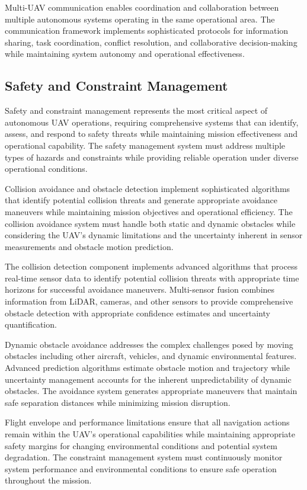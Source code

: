 Multi-UAV communication enables coordination and collaboration between multiple autonomous systems operating in the same operational area. The communication framework implements sophisticated protocols for information sharing, task coordination, conflict resolution, and collaborative decision-making while maintaining system autonomy and operational effectiveness.

\subsection{Safety and Constraint Management}

Safety and constraint management represents the most critical aspect of autonomous UAV operations, requiring comprehensive systems that can identify, assess, and respond to safety threats while maintaining mission effectiveness and operational capability. The safety management system must address multiple types of hazards and constraints while providing reliable operation under diverse operational conditions.

Collision avoidance and obstacle detection implement sophisticated algorithms that identify potential collision threats and generate appropriate avoidance maneuvers while maintaining mission objectives and operational efficiency. The collision avoidance system must handle both static and dynamic obstacles while considering the UAV's dynamic limitations and the uncertainty inherent in sensor measurements and obstacle motion prediction.

The collision detection component implements advanced algorithms that process real-time sensor data to identify potential collision threats with appropriate time horizons for successful avoidance maneuvers. Multi-sensor fusion combines information from LiDAR, cameras, and other sensors to provide comprehensive obstacle detection with appropriate confidence estimates and uncertainty quantification.

Dynamic obstacle avoidance addresses the complex challenges posed by moving obstacles including other aircraft, vehicles, and dynamic environmental features. Advanced prediction algorithms estimate obstacle motion and trajectory while uncertainty management accounts for the inherent unpredictability of dynamic obstacles. The avoidance system generates appropriate maneuvers that maintain safe separation distances while minimizing mission disruption.

Flight envelope and performance limitations ensure that all navigation actions remain within the UAV's operational capabilities while maintaining appropriate safety margins for changing environmental conditions and potential system degradation. The constraint management system must continuously monitor system performance and environmental conditions to ensure safe operation throughout the mission.

